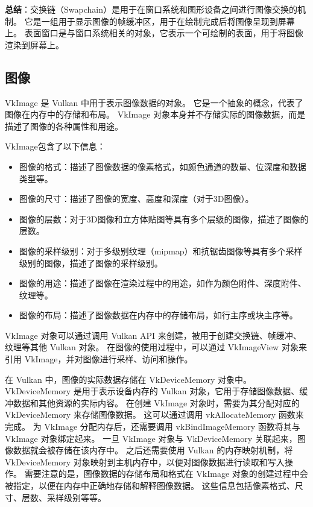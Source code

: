 \documentclass[a4paper, 12pt]{ctexart}
\begin{document}
    \textbf{总结}：交换链（Swapchain）是用于在窗口系统和图形设备之间进行图像交换的机制。
    它是一组用于显示图像的帧缓冲区，用于在绘制完成后将图像呈现到屏幕上。
    表面窗口是与窗口系统相关的对象，它表示一个可绘制的表面，用于将图像渲染到屏幕上。


\clearpage
\subsection{图像}
    VkImage 是 Vulkan 中用于表示图像数据的对象。
    它是一个抽象的概念，代表了图像在内存中的存储和布局。
    VkImage 对象本身并不存储实际的图像数据，而是描述了图像的各种属性和用途。

    VkImage包含了以下信息：

    \begin{itemize}[itemindent=1em, itemsep=0pt, topsep=0pt, parsep=0pt]
        \item 图像的格式：描述了图像数据的像素格式，如颜色通道的数量、位深度和数据类型等。
        \item 图像的尺寸：描述了图像的宽度、高度和深度（对于3D图像）。
        \item 图像的层数：对于3D图像和立方体贴图等具有多个层级的图像，描述了图像的层数。
        \item 图像的采样级别：对于多级别纹理（mipmap）和抗锯齿图像等具有多个采样级别的图像，描述了图像的采样级别。
        \item 图像的用途：描述了图像在渲染过程中的用途，如作为颜色附件、深度附件、纹理等。
        \item 图像的布局：描述了图像数据在内存中的存储布局，如行主序或块主序等。
    \end{itemize}

    VkImage 对象可以通过调用 Vulkan API 来创建，被用于创建交换链、帧缓冲、纹理等其他 Vulkan 对象。
    在图像的使用过程中，可以通过 VkImageView 对象来引用 VkImage，并对图像进行采样、访问和操作。

    在 Vulkan 中，图像的实际数据存储在 VkDeviceMemory 对象中。
    VkDeviceMemory 是用于表示设备内存的 Vulkan 对象，它用于存储图像数据、缓冲数据和其他资源的实际内容。
    在创建 VkImage 对象时，需要为其分配对应的 VkDeviceMemory 来存储图像数据。
    这可以通过调用 vkAllocateMemory 函数来完成。
    为 VkImage 分配内存后，还需要调用 vkBindImageMemory 函数将其与 VkImage 对象绑定起来。
    一旦 VkImage 对象与 VkDeviceMemory 关联起来，图像数据就会被存储在该内存中。
    之后还需要使用 Vulkan 的内存映射机制，将 VkDeviceMemory 对象映射到主机内存中，以便对图像数据进行读取和写入操作。
    需要注意的是，图像数据的存储布局和格式在 VkImage 对象的创建过程中会被指定，以便在内存中正确地存储和解释图像数据。
    这些信息包括像素格式、尺寸、层数、采样级别等等。
\end{document}
